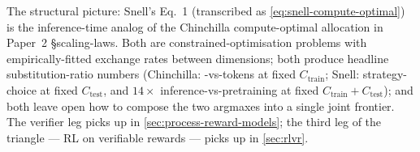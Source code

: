 The structural picture: Snell's Eq.~1 (transcribed as
\cref{eq:snell-compute-optimal}) is the inference-time analog of the
Chinchilla compute-optimal allocation in Paper~2 \S scaling-laws. Both
are constrained-optimisation problems with empirically-fitted exchange
rates between dimensions; both produce headline substitution-ratio
numbers (Chinchilla: -vs-tokens at fixed
$C_\text{train}$; Snell: strategy-choice at fixed $C_\text{test}$, and
$14\times$ inference-vs-pretraining at fixed
$C_\text{train} + C_\text{test}$); and both leave open how to compose
the two argmaxes into a single joint frontier. The verifier leg picks
up in \cref{sec:process-reward-models}; the third leg of the triangle
--- RL on verifiable rewards --- picks up in \cref{sec:rlvr}.
